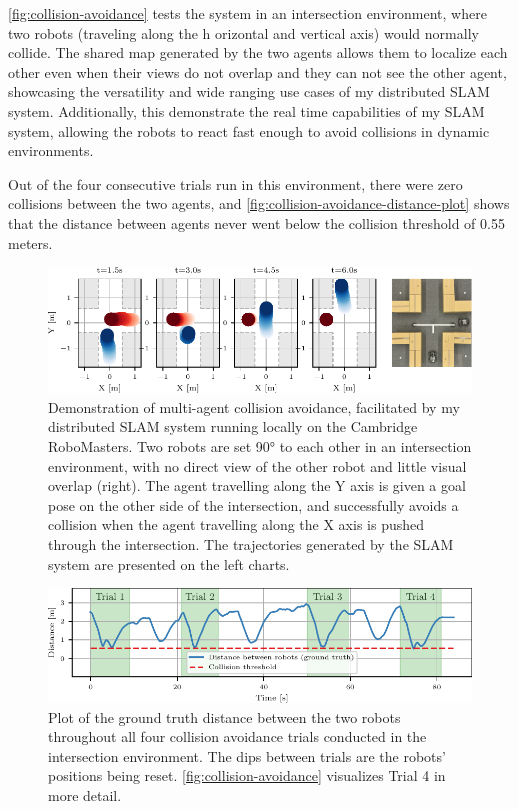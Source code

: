 \autoref{fig:collision-avoidance} tests the system in an intersection environment, where two robots (traveling along the h orizontal and vertical axis) would normally collide. The shared map generated by the two agents allows them to localize each other even when their views do not overlap and they can not see the other agent, showcasing the versatility and wide ranging use cases of my distributed SLAM system. Additionally, this demonstrate the real time capabilities of my SLAM system, allowing the robots to react fast enough to avoid collisions in dynamic environments.

Out of the four consecutive trials run in this environment, there were zero collisions between the two agents, and \autoref{fig:collision-avoidance-distance-plot} shows that the distance between agents never went below the collision threshold of 0.55 meters.


\begin{figure}[h]
    \centering
    \includegraphics[width=\linewidth]{figures/mar25_1_tracer_graph.pdf}

    \caption{Demonstration of multi-agent collision avoidance, facilitated by my distributed SLAM system running locally on the Cambridge RoboMasters. Two robots are set 90° to each other in an intersection environment, with no direct view of the other robot and little visual overlap (right). The agent travelling along the Y axis is given a goal pose on the other side of the intersection, and successfully avoids a collision when the agent travelling along the X axis is pushed through the intersection. The trajectories generated by the SLAM system are presented on the left charts.}
    \label{fig:collision-avoidance}
\end{figure}

\begin{figure}[h]
    \centering
    \includegraphics[width=\linewidth]{figures/mar25_1_distance_plot.pdf}

    \caption{Plot of the ground truth distance between the two robots throughout all four collision avoidance trials conducted in the intersection environment. The dips between trials are the robots' positions being reset. \autoref{fig:collision-avoidance} visualizes Trial 4 in more detail.}
    \label{fig:collision-avoidance-distance-plot}
\end{figure}

